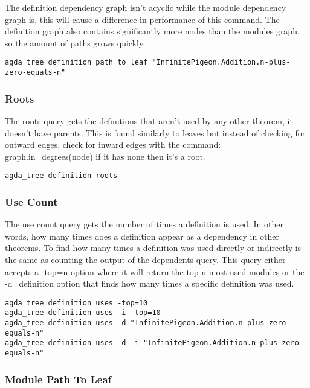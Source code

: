 The definition dependency graph isn't acyclic while the module dependency graph
is, this will cause a difference in performance of this command. The definition
graph also contains significantly more nodes than the modules graph, so the
amount of paths grows quickly.

\begin{lstlisting}
agda_tree definition path_to_leaf "InfinitePigeon.Addition.n-plus-zero-equals-n"
\end{lstlisting}

\subsubsection{Roots}

The roots query gets the definitions that aren't used by any other theorem, it
doesn't have parents. This is found similarly to leaves but instead of checking
for outward edges, check for inward edges with the command: \linebreak
\textsf{graph.in\_degrees(node)} if it has none then it's a root.

\begin{lstlisting}
agda_tree definition roots
\end{lstlisting}

\subsubsection{Use Count}

The use count query gets the number of times a definition is used. In other
words, how many times does a definition appear as a dependency in other
theorems. To find how many times a definition was used directly or indirectly
is the same as counting the output of the dependents query. This query either
accepts a -top=n option where it will return the top n most used modules or the
-d=definition option that finds how many times a specific definition was used.

\begin{lstlisting}
agda_tree definition uses -top=10
agda_tree definition uses -i -top=10
agda_tree definition uses -d "InfinitePigeon.Addition.n-plus-zero-equals-n"
agda_tree definition uses -d -i "InfinitePigeon.Addition.n-plus-zero-equals-n"
\end{lstlisting}

\subsubsection{Module Path To Leaf}

